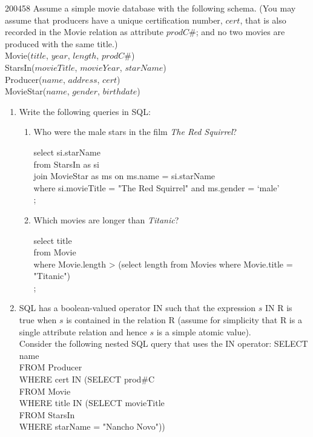 \documentclass[10pt,\jkfside,a4paper]{article}
\begin{document}
\begin{examquestion}{2004}{5}{8}
Assume a simple movie database with the following schema. (You may assume
that producers have a unique certification number, $cert$, that is also recorded in
the Movie relation as attribute $prodC\#$; and no two movies are produced with the
same title.)\\
Movie($title$, $year$, $length$, $prodC\#$)\\
StarsIn($movieTitle$, $movieYear$, $starName$)\\
Producer($name$, $address$, $cert$)\\
MovieStar($name$, $gender$, $birthdate$)
\begin{enumerate}
\item{Write the following queries in SQL:}
\begin{enumerate}
\item{Who were the male stars in the film \textit{The Red Squirrel}?}

{\ttfamily
select si.starName\\
from StarsIn as si\\
join MovieStar as ms on ms.name = si.starName\\
where si.movieTitle = "The Red Squirrel" and ms.gender = `male'\\
;
}

\item{Which movies are longer than \textit{Titanic}?}

{\ttfamily
select title\\
from Movie\\
where Movie.length > (select length from Movies where Movie.title = "Titanic")\\
;
}
\end{enumerate}

\item{SQL has a boolean-valued operator {\ttfamily IN} such that the expression $s$ {\ttfamily IN R} is true
when $s$ is contained in the relation {\ttfamily R} (assume for simplicity that {\ttfamily R} is a single
attribute relation and hence $s$ is a simple atomic value).\\
Consider the following nested SQL query that uses the {\ttfamily IN} operator:
{\ttfamily SELECT name \\
FROM Producer\\
WHERE cert IN (SELECT prod\#C\\
FROM Movie\\
WHERE title IN (SELECT movieTitle\\
FROM StarsIn\\
WHERE starName = "Nancho Novo"))}}


\end{enumerate}
\end{examquestion}
\end{document}
